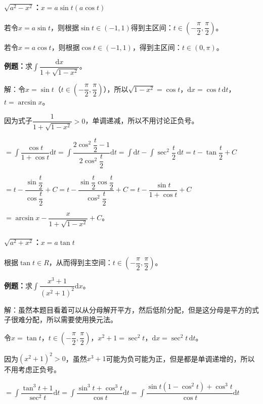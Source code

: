 \documentclass[UTF8, 12pt]{ctexart}
\begin{document}
\paragraph{\texorpdfstring{$\sqrt{a^2-x^2}$：$x=a\sin t(a\cos t)$}\ } \leavevmode \medskip

若令$x=a\sin t$，则根据$\sin t\in(-1,1)$得到主区间：$t\in\left(-\dfrac{\pi}{2},\dfrac{\pi}{2}\right)$。

若令$x=a\cos t$，则根据$\cos t\in(-1,1)$，得到主区间：$t\in(0,\pi)$。

\textbf{例题：}求$\displaystyle{\int\dfrac{\textrm{d}x}{1+\sqrt{1-x^2}}}$。\medskip

解：令$x=\sin t$（$t\in\left(-\dfrac{\pi}{2},\dfrac{\pi}{2}\right)$），所以$\sqrt{1-x^2}=\cos t$，$\textrm{d}x=\cos t\,\textrm{d}t$，$t=\arcsin x$。

因为式子$\dfrac{1}{1+\sqrt{1-x^2}}>0$，单调递减，所以不用讨论正负号。

$=\displaystyle{\int\dfrac{\cos t}{1+\cos t}\textrm{d}t=\int\dfrac{2\cos^2\dfrac{t}{2}-1}{2\cos^2\dfrac{t}{2}}\textrm{d}t=\int\textrm{d}t-\int\sec^2\dfrac{t}{2}\,\textrm{d}t=t-\tan}\dfrac{t}{2}+C$

$=t-\dfrac{\sin\dfrac{t}{2}}{\cos\dfrac{t}{2}}+C=t-\dfrac{\sin\dfrac{t}{2}\cos\dfrac{t}{2}}{\cos^2\dfrac{t}{2}}+C=t-\dfrac{\sin t}{1+\cos t}+C$

$=\arcsin x-\dfrac{x}{1+\sqrt{1-x^2}}+C$。

\paragraph{\texorpdfstring{$\sqrt{a^2+x^2}$：$x=a\tan t$}\ } \leavevmode \medskip

根据$\tan t\in R$，从而得到主空间：$t\in\left(-\dfrac{\pi}{2},\dfrac{\pi}{2}\right)$。

\textbf{例题：}求$\displaystyle{\int\dfrac{x^3+1}{(x^2+1)^2}\textrm{d}x}$。\medskip

解：虽然本题目看着可以从分母解开平方，然后低阶分配，但是这分母是平方的式子很难分配，所以需要使用换元法。

令$x=\tan t$，$t\in\left(-\dfrac{\pi}{2},\dfrac{\pi}{2}\right)$，$x^2+1=\sec^2t$，$\textrm{d}x=\sec^2t\,\textrm{d}t$。

因为$(x^2+1)^2>0$，虽然$x^3+1$可能为负可能为正，但是都是单调递增的，所以不用考虑正负号。

$=\displaystyle{\int\dfrac{\tan^3t+1}{\sec^2t}\textrm{d}t=\int\dfrac{\sin^3t+\cos^3t}{\cos t}\textrm{d}t=\int\dfrac{\sin t(1-\cos^2t)+\cos^3t}{\cos t}\textrm{d}t}$
\end{document}
